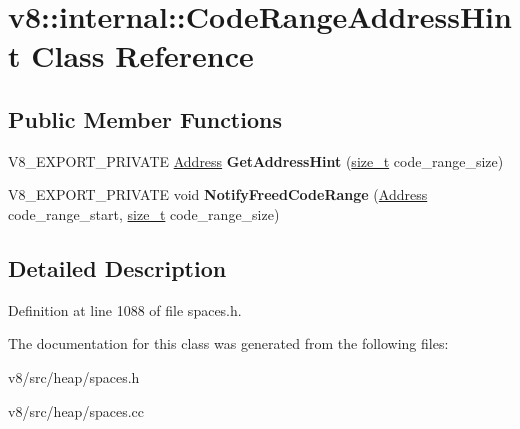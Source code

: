 \hypertarget{classv8_1_1internal_1_1CodeRangeAddressHint}{}\section{v8\+:\+:internal\+:\+:Code\+Range\+Address\+Hint Class Reference}
\label{classv8_1_1internal_1_1CodeRangeAddressHint}
\subsection*{Public Member Functions}
\begin{DoxyCompactItemize}
\item 
\mbox{\label{classv8_1_1internal_1_1CodeRangeAddressHint_a3ef49faa4deff3a4680fb79f0367deee}} 
V8\+\_\+\+E\+X\+P\+O\+R\+T\+\_\+\+P\+R\+I\+V\+A\+TE \mbox{\hyperlink{classuintptr__t}{Address}} {\bfseries Get\+Address\+Hint} (\mbox{\hyperlink{classsize__t}{size\+\_\+t}} code\+\_\+range\+\_\+size)
\item 
\mbox{\label{classv8_1_1internal_1_1CodeRangeAddressHint_aa81e69681bc6caf874f8824730b20cc7}} 
V8\+\_\+\+E\+X\+P\+O\+R\+T\+\_\+\+P\+R\+I\+V\+A\+TE void {\bfseries Notify\+Freed\+Code\+Range} (\mbox{\hyperlink{classuintptr__t}{Address}} code\+\_\+range\+\_\+start, \mbox{\hyperlink{classsize__t}{size\+\_\+t}} code\+\_\+range\+\_\+size)
\end{DoxyCompactItemize}


\subsection{Detailed Description}


Definition at line 1088 of file spaces.\+h.



The documentation for this class was generated from the following files\+:\begin{DoxyCompactItemize}
\item 
v8/src/heap/spaces.\+h\item 
v8/src/heap/spaces.\+cc\end{DoxyCompactItemize}
